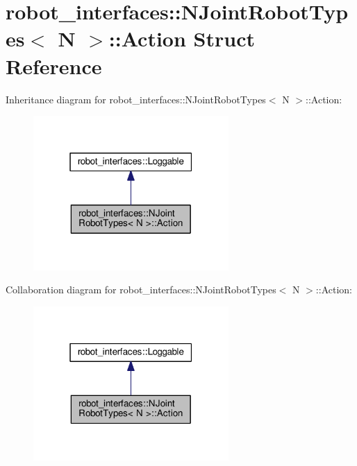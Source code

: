\hypertarget{structrobot__interfaces_1_1NJointRobotTypes_1_1Action}{}\section{robot\+\_\+interfaces\+:\+:N\+Joint\+Robot\+Types$<$ N $>$\+:\+:Action Struct Reference}
\label{structrobot__interfaces_1_1NJointRobotTypes_1_1Action}


Inheritance diagram for robot\+\_\+interfaces\+:\+:N\+Joint\+Robot\+Types$<$ N $>$\+:\+:Action\+:
\nopagebreak
\begin{figure}[H]
\begin{center}
\leavevmode
\includegraphics[width=211pt]{structrobot__interfaces_1_1NJointRobotTypes_1_1Action__inherit__graph}
\end{center}
\end{figure}


Collaboration diagram for robot\+\_\+interfaces\+:\+:N\+Joint\+Robot\+Types$<$ N $>$\+:\+:Action\+:
\nopagebreak
\begin{figure}[H]
\begin{center}
\leavevmode
\includegraphics[width=211pt]{structrobot__interfaces_1_1NJointRobotTypes_1_1Action__coll__graph}
\end{center}
\end{figure}
